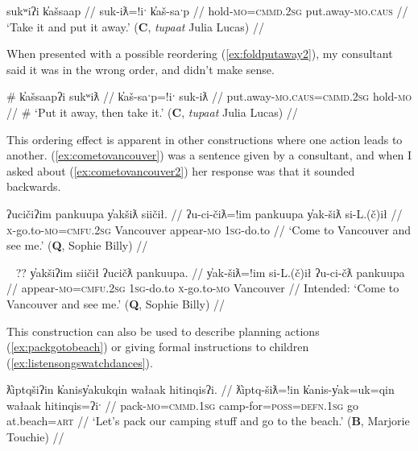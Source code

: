 \ex \label{ex:foldputaway1}
\begingl
\glpreamble sukʷiʔi k̓ašsaap //
\gla suk-iƛ=!iˑ k̓aš-saˑp //
\glb hold-\textsc{mo}=\textsc{cmmd.2sg} put.away-\textsc{mo.caus} //
\glft `Take it and put it away.' (\textbf{C}, \textit{tupaat} Julia Lucas) //
\endgl
\xe

When presented with a possible reordering (\ref{ex:foldputaway2}), my consultant said it was in the wrong order, and didn't make sense.

\ex \label{ex:foldputaway2}
\begingl
\glpreamble \# k̓ašsaapʔi sukʷiƛ //
\gla k̓aš-saˑp=!iˑ suk-iƛ //
\glb put.away-\textsc{mo.caus}=\textsc{cmmd.2sg} hold-\textsc{mo} //
\glft \# `Put it away, then take it.' (\textbf{C}, \textit{tupaat} Julia Lucas) //
\endgl
\xe

This ordering effect is apparent in other constructions where one action leads to another. (\ref{ex:cometovancouver}) was a sentence given by a consultant, and when I asked about (\ref{ex:cometovancouver2}) her response was that it sounded backwards.

\ex \label{ex:cometovancouver}
\begingl
\glpreamble ʔucičiʔim pankuupa y̓akšiƛ siičił. //
\gla ʔu-ci-čiƛ=!im pankuupa y̓ak-šiƛ si-L.(č)ił //
\glb \textsc{x}-go.to-\textsc{mo}=\textsc{cmfu.2sg} Vancouver appear-\textsc{mo} \textsc{1sg}-do.to //
\glft `Come to Vancouver and see me.' (\textbf{Q}, Sophie Billy) //
\endgl
\xe

\ex~ \label{ex:cometovancouver2}
\begingl
\glpreamble ?? y̓akšiʔim siičił ʔucičƛ pankuupa. //
\gla y̓ak-šiƛ=!im si-L.(č)ił ʔu-ci-čƛ pankuupa //
\glb appear-\textsc{mo}=\textsc{cmfu.2sg} \textsc{1sg}-do.to \textsc{x}-go.to-\textsc{mo} Vancouver //
\glft Intended: `Come to Vancouver and see me.' (\textbf{Q}, Sophie Billy) //
\endgl
\xe

This construction can also be used to describe planning actions (\ref{ex:packgotobeach}) or giving formal instructions to children (\ref{ex:listensongswatchdances}).

\ex \label{ex:packgotobeach}
\begingl
\glpreamble ƛ̓iptqšiʔin k̓anisy̓akukqin wałaak hitinqisʔi. //
\gla ƛ̓iptq-šiƛ=!in k̓anis-y̓ak=uk=qin wałaak hitinqis=ʔiˑ //
\glb pack-\textsc{mo}=\textsc{cmmd.1sg} camp-for=\textsc{poss}=\textsc{defn.1sg} go at.beach=\textsc{art} //
\glft `Let's pack our camping stuff and go to the beach.' (\textbf{B}, Marjorie Touchie) //
\endgl
\xe

